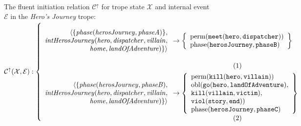 \begin{figure}[!t]
The fluent initiation relation $\mathcal{C^{\uparrow}}$ for trope state $\mathcal{X}$ and internal event $\mathcal{E}$ in the \emph{Hero's Journey} trope:\\
$\mathcal{C^{\uparrow}(X, E)}:\left\{\mbox{%
\begin{minipage}[c]{0.85\textwidth}
\begin{align}
\begin{array}{r}
                                 \langle \{\mathit{phase(herosJourney, phaseA)}\},\\
  \mathit{intHerosJourney(hero, dispatcher, villain},\\
\mathit{home, landOfAdventure)}\} \rangle
\end{array}
&\rightarrow
\left\{\begin{array}{l}
\text{perm}(\mathtt{meet(hero, dispatcher)})\\
\text{phase}(\mathtt{herosJourney, phaseB})
\end{array}\right\}\label{eq:cfirst}\\
\begin{array}{r}
                                 \langle\{\mathit{phase(herosJourney, phaseB)},\\
  \mathit{intHerosJourney(hero, dispatcher, villain},\\ \mathit{home, landOfAdventure)}\} \rangle\\
  \end{array}
&\rightarrow \left\{
\begin{array}{l}
  \text{perm}(\mathtt{kill(hero, villain)}) \\
\text{obl}(\mathtt{go(hero, landOfAdventure),} \\
\mathtt{kill(villain, victim)},\\
\mathtt{viol(story, end)})\\
\text{phase}(\mathtt{herosJourney, phaseC})
\end{array}
\right\}\label{eq:phaseb}
\end{align}
\end{minipage}
}\right.$\smallskip



\end{figure}
